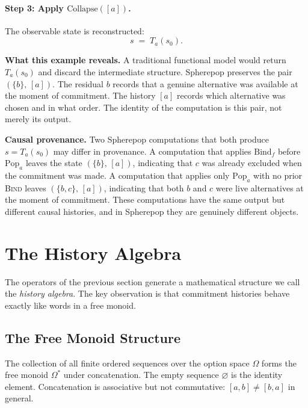 \documentclass[12pt]{article}
\begin{document}
\paragraph{Step 3: Apply $\mathrm{Collapse}([a])$.}

The observable state is reconstructed:
\[
s \;=\; T_a(s_0).
\]

\medskip

\noindent \textbf{What this example reveals.} A traditional functional model would return $T_a(s_0)$ and discard the intermediate structure. Spherepop preserves the pair $(\{b\},\, [a])$. The residual $b$ records that a genuine alternative was available at the moment of commitment. The history $[a]$ records which alternative was chosen and in what order. The identity of the computation is this pair, not merely its output.

\medskip

\noindent \textbf{Causal provenance.} Two Spherepop computations that both produce $s = T_a(s_0)$ may differ in provenance. A computation that applies $\mathrm{Bind}_f$ before $\mathrm{Pop}_a$ leaves the state $(\{b\},\, [a])$, indicating that $c$ was already excluded when the commitment was made. A computation that applies only $\mathrm{Pop}_a$ with no prior \textsc{Bind} leaves $(\{b,c\},\, [a])$, indicating that both $b$ and $c$ were live alternatives at the moment of commitment. These computations have the same output but different causal histories, and in Spherepop they are genuinely different objects.

\section{The History Algebra}
\label{sec:algebra}

The operators of the previous section generate a mathematical structure we call the \emph{history algebra}. The key observation is that commitment histories behave exactly like words in a free monoid.

\subsection{The Free Monoid Structure}

The collection of all finite ordered sequences over the option space $\Omega$ forms the free monoid $\Omega^*$ under concatenation. The empty sequence $\varnothing$ is the identity element. Concatenation is associative but not commutative: $[a,b] \neq [b,a]$ in general.
\end{document}
